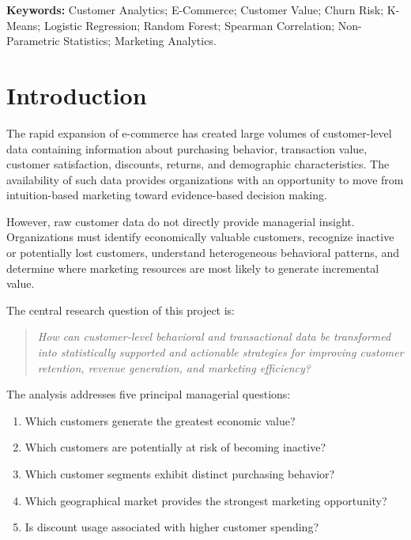 \documentclass[11pt,a4paper]{article}
\begin{document}
\textbf{Keywords:} Customer Analytics; E-Commerce; Customer Value; Churn Risk; K-Means; Logistic Regression; Random Forest; Spearman Correlation; Non-Parametric Statistics; Marketing Analytics.


\newpage
\tableofcontents
\newpage


\section{Introduction}

The rapid expansion of e-commerce has created large volumes of customer-level data containing information about purchasing behavior, transaction value, customer satisfaction, discounts, returns, and demographic characteristics. The availability of such data provides organizations with an opportunity to move from intuition-based marketing toward evidence-based decision making.

However, raw customer data do not directly provide managerial insight. Organizations must identify economically valuable customers, recognize inactive or potentially lost customers, understand heterogeneous behavioral patterns, and determine where marketing resources are most likely to generate incremental value.

The central research question of this project is:

\begin{quote}
\textit{How can customer-level behavioral and transactional data be transformed into statistically supported and actionable strategies for improving customer retention, revenue generation, and marketing efficiency?}
\end{quote}

The analysis addresses five principal managerial questions:

\begin{enumerate}[label=\arabic*.]
    \item Which customers generate the greatest economic value?
    \item Which customers are potentially at risk of becoming inactive?
    \item Which customer segments exhibit distinct purchasing behavior?
    \item Which geographical market provides the strongest marketing opportunity?
    \item Is discount usage associated with higher customer spending?
\end{enumerate}
\end{document}
